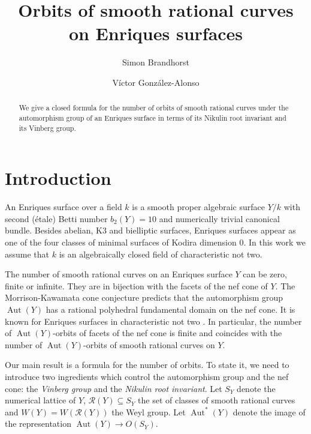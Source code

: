 \documentclass[a4paper]{amsart}
\title[]{Orbits of smooth rational curves on Enriques surfaces}
\author{Simon Brandhorst}
\author{Víctor González-Alonso}
\theoremstyle{definition}
\theoremstyle{plain}
\DeclareMathOperator{\Aut}{Aut}
\newcommand{\R}{\mathcal{R}}
\begin{document}
\begin{abstract}
We give a closed formula for the number of orbits of smooth rational curves under the automorphism group of an Enriques surface in terms of its Nikulin root invariant and its Vinberg group. 
\end{abstract}
\maketitle
{}
\section{Introduction}
An Enriques surface over a field $k$ is a smooth proper algebraic surface $Y/k$ with second (étale) Betti number $b_2(Y)=10$ and numerically trivial canonical bundle. Besides abelian, K3 and bielliptic surfaces, Enriques surfaces appear as one of the four classes of minimal surfaces of Kodira dimension $0$.
In this work we assume that $k$ is an algebraically closed field of characteristic not two. 

The number of smooth rational curves on an Enriques surface $Y$ can be zero, finite or infinite. 
They are in bijection with the facets of the nef cone of $Y$.
The Morrison-Kawamata cone conjecture predicts that the automorphism group $\Aut(Y)$ has a rational polyhedral fundamental domain on the nef cone. It is known for Enriques surfaces in characteristic not two \cite{namikawa:periods_of_enriques,wang}. In particular, the number of $\Aut(Y)$-orbits of facets of the nef cone is finite and coincides with the number of $\Aut(Y)$-orbits of smooth rational curves on $Y$.

Our main result is a formula for the number of orbits. To state it, we need to introduce two ingredients which control the automorphism group and the nef cone: the \emph{Vinberg group} and the \emph{Nikulin root invariant}.
Let $S_Y$ denote the numerical lattice of $Y$, $\R(Y)\subseteq S_Y$ the set of classes of smooth rational curves and $W(Y)=W(\R(Y))$ the Weyl group. Let $\Aut^*(Y)$ denote the image of the representation $\Aut(Y) \to O(S_Y)$.
\end{document}
